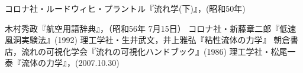 \documentclass[a4paper,titlepage]{ltjsarticle}
\begin{document}
 \clearpage
\begin{thebibliography}{99}
   コロナ社・ルードウィヒ・プラントル『流れ学(下)』，(昭和50年)

   木村秀政『航空用語辞典』，（昭和56年 7月15日）
  コロナ社・新藤章二郎『低速風洞実験法』(1992)
  理工学社・生井武文，井上雅弘『粘性流体の力学』
  朝倉書店，流れの可視化学会『流れの可視化ハンドブック』(1986)
     理工学社・松尾一泰『流体の力学』，(2007.10.30)
  
  
\end{thebibliography}
\end{document}
